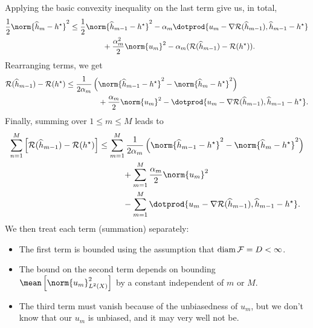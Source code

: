 Applying the basic convexity inequality on the last term give us, in total,
\begin{align*}
    \frac{ 1 }{ 2 } \norm{ \hat{ h }_{ m } - \hstar }^2
    &\leq
    \frac{ 1 }{ 2 } \norm{ \hat{ h }_{ m-1 } - \hstar }^2
    - \alpha_{ m } \dotprod{ u_{ m } - \nabla \risk ( \hat{ h }_{ m-1 } ), \hat{ h }_{ m-1 } - \hstar } \\
    &\hspace{1.5cm}
    + \frac{ \alpha_{ m }^2 }{ 2 } \norm{ u_{ m } }^2
    - \alpha_{ m } ( \risk ( \hat{ h }_{ m-1 } ) - \risk ( \hstar ) )
.\end{align*}
Rearranging terms, we get
\begin{align*}
    \risk ( \hat{ h }_{ m-1 } ) - \risk ( \hstar )
    &\leq
    \frac{ 1 }{ 2 \alpha_{ m } } \left(
        \norm{ \hat{ h }_{ m-1 } - \hstar }^2
        -
        \norm{ \hat{ h }_{ m } - \hstar }^2
    \right) \\
    &\hspace{1.5cm}+ \frac{ \alpha_{ m } }{ 2 } \norm{ u_{ m } }^2
    - \dotprod{ u_{ m } - \nabla \risk ( \hat{ h }_{ m-1 } ), \hat{ h }_{ m-1 } - \hstar }
.\end{align*}
Finally, summing over $ 1 \leq m \leq M $ leads to
\begin{align*}
    \sum_{ n=1 }^{ M } \left[
        \risk ( \hat{ h }_{ m-1 } ) - \risk ( \hstar )
    \right]
    &\leq \sum_{ m=1 }^{ M } \frac{ 1 }{ 2 \alpha_{ m } } \left(
        \norm{ \hat{ h }_{ m-1 } - \hstar }^2
        -
        \norm{ \hat{ h }_{ m } - \hstar }^2
    \right) \\
    &\hspace{1cm} + \sum_{ m=1 }^{ M } \frac{ \alpha_{ m } }{ 2 } \norm{ u_{ m } }^2 \\
    &\hspace{1cm} - \sum_{ m=1 }^{ M }
    \dotprod{ u_{ m } - \nabla \risk ( \hat{ h }_{ m-1 } ), \hat{ h }_{ m-1 } - \hstar }
.\end{align*}
We then treat each term (summation) separately:
\begin{itemize}
    \item The first term is bounded using the assumption that $ \operatorname{diam} \mathcal{F} = D < \infty $.
    \item The bound on the second term depends on bounding $ \mean \left[ \norm{ u_{ m } }^2_{ L^{ 2 } ( X ) } \right] $ by a constant independent of $ m $ or $ M $.
    \item The third term must vanish because of the unbiasedness of $ u_{ m } $, but we don't know that our $ u_{ m } $ is unbiased, and it may very well not be.
\end{itemize}

